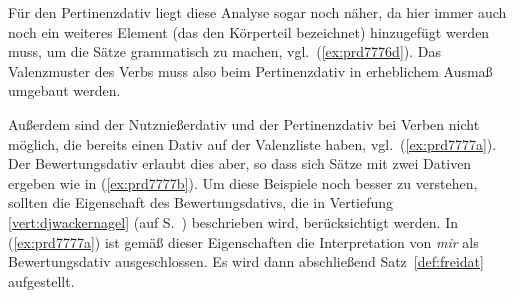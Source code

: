 Für den Pertinenzdativ liegt diese Analyse sogar noch näher, da hier immer auch noch ein weiteres Element (das den Körperteil bezeichnet) hinzugefügt werden muss, um die Sätze grammatisch zu machen, vgl.\ (\ref{ex:prd7776d}).
Das Valenzmuster des Verbs muss also beim Pertinenzdativ in erheblichem Ausmaß umgebaut werden.

\begin{exe}
\end{exe}

Außerdem sind der Nutznießerdativ und der Pertinenzdativ bei Verben nicht möglich, die bereits einen Dativ auf der Valenzliste haben, vgl.\ (\ref{ex:prd7777a}).
Der Bewertungsdativ erlaubt dies aber, so dass sich Sätze mit zwei Dativen ergeben wie in (\ref{ex:prd7777b}).
Um diese Beispiele noch besser zu verstehen, sollten die Eigenschaft des Bewertungsdativs, die in Vertiefung \ref{vert:djwackernagel} (auf S.~\pageref{vert:djwackernagel}) beschrieben wird, berücksichtigt werden.
In (\ref{ex:prd7777a}) ist gemäß dieser Eigenschaften die Interpretation von \textit{mir} als Bewertungsdativ ausgeschlossen.
Es wird dann abschließend Satz~\ref{def:freidat} aufgestellt.

\begin{exe}
  \ex\label{ex:prd7777}
  \begin{xlist}
  \end{xlist}
\end{exe}


